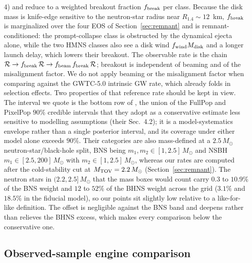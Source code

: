 \documentclass[twocolumn,apj]{openjournal}
\newcommand{\Msun}{M_\odot}
\newcommand{\Mtov}{M_{\rm TOV}}
\newcommand{\Mdisk}{M_{\rm disk}}
\begin{document}
4) and reduce to a weighted breakout fraction $f_{\rm break}$ per
class. Because the disk mass is knife-edge sensitive to the neutron-star radius
near $R_{1.4}\sim 12$~km, $f_{\rm break}$ is marginalized over the four EOS of
Section~\ref{sec:remnant} and is remnant-conditioned: the prompt-collapse class
is obstructed by the dynamical ejecta alone, while the two HMNS classes also see
a disk wind $f_{\rm wind}\Mdisk$ and a longer launch delay, which lowers their
breakout. The observable rate is the chain
$\mathcal{R} \to f_{\rm break}\,\mathcal{R} \to f_{\rm beam}\,f_{\rm break}\,\mathcal{R}$;
breakout is independent of beaming and of the misalignment factor.
We do not apply beaming or the misalignment factor when comparing against
the GWTC-5.0 intrinsic GW rate, which already folds in selection effects.
Two properties of that reference rate should be kept in view. The interval we
quote is the bottom row of \citet[their Table~2]{abac2026}, the union of the
FullPop and PixelPop $90\%$ credible intervals that they adopt as a conservative
estimate less sensitive to modelling assumptions (their Sec.~4.2); it is a
model-systematics envelope rather than a single posterior interval, and its
coverage under either model alone exceeds $90\%$. Their categories are also
mass-defined at a $2.5\,\Msun$ neutron-star/black-hole split, BNS being
$m_1, m_2 \in [1, 2.5]\,\Msun$ and NSBH $m_1 \in [2.5, 200]\,\Msun$ with
$m_2 \in [1, 2.5]\,\Msun$, whereas our rates are computed after the
cold-stability cut at $\Mtov = 2.2\,\Msun$ (Section~\ref{sec:remnant}). The
neutron stars in $(2.2, 2.5]\,\Msun$ that the mass boxes would count carry
$0.3$ to $10.9\%$ of the BNS weight and $12$ to $52\%$ of the BHNS weight across
the grid ($3.1\%$ and $18.5\%$ in the fiducial model), so our points sit slightly
low relative to a like-for-like definition. The offset is negligible against the
BNS band and deepens rather than relieves the BHNS excess, which makes every
comparison below the conservative one.

\subsection{Observed-sample engine comparison} \label{sec:obsmethod}
\end{document}
